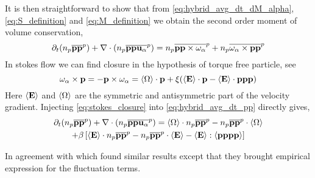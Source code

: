 It is then straightforward to show that from \ref{eq:hybrid_avg_dt_dM_alpha},\ref{eq:S_definition} and \ref{eq:M_definition} we obtain the second order moment of volume conservation,
\begin{equation}
    \partial_t (n_p\overline{\textbf{pp}}^{p})
    + \mathbf{\nabla}\cdot (
        n_p\overline{\textbf{pp}\textbf{u}_\alpha}^{p}
        )
    = 
    n_p\overline{\textbf{pp} \times \omega_\alpha}^{p}
    + n_p\overline{\omega_\alpha \times \textbf{pp}}^{p} 
    \label{eq:hybrid_avg_dt_pp}
\end{equation}
In stokes flow we can find closure in the hypothesis of torque free particle, see \citet{kim2013microhydrodynamics}
\begin{equation}
    \omega_\alpha \times \textbf{p} 
    = -  \textbf{p} \times \omega_\alpha 
    = \left<\Omega\right> \cdot \textbf{p} + \xi(\left<\textbf{E}\right> \cdot \textbf{p} - \left<\textbf{E}\right> \cdot \textbf{ppp})
    \label{eq:stokes_closure}
\end{equation}
Here $\left<\textbf{E}\right>$ and $\left<\Omega\right>$ are the symmetric and antisymmetric part of the velocity gradient. 
Injecting \ref{eq:stokes_closure} into \ref{eq:hybrid_avg_dt_pp} directly gives,
\begin{multline}
    \partial_t (n_p\overline{\textbf{pp}}^{p})
    + \mathbf{\nabla}\cdot (
        n_p\overline{\textbf{pp}\textbf{u}_\alpha}^{p}
        )
    = 
    \left<\Omega\right> \cdot n_p\overline{\textbf{pp}}^{p} 
    - n_p\overline{\textbf{pp}}^{p} \cdot \left<\Omega\right> \\
    + \beta\left[
        \left<\textbf{E}\right> \cdot n_p\overline{\textbf{pp}}^{p} 
        -n_p\overline{\textbf{pp}}^{p} \cdot \left<\textbf{E}\right> 
    - \left<\textbf{E}\right> : \left<\textbf{pppp}\right>
    \right]
\end{multline}

In agreement with \citet{advani1987use} which found similar results except that they brought empirical expression for the fluctuation terms. 

